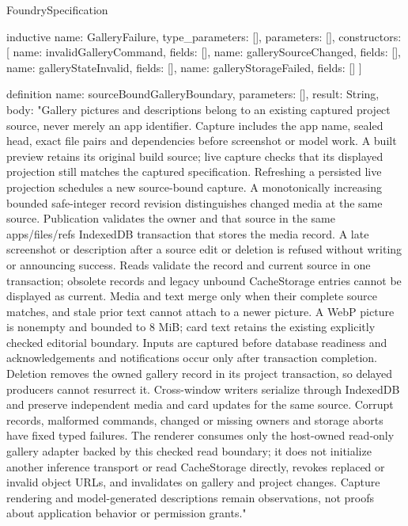 \begin{lexlean}{FoundrySpecification}
\begin{semanticmodule}
inductive{
  name: GalleryFailure,
  type_parameters: [],
  parameters: [],
  constructors: [
    {name: invalidGalleryCommand, fields: []},
    {name: gallerySourceChanged, fields: []},
    {name: galleryStateInvalid, fields: []},
    {name: galleryStorageFailed, fields: []}
  ]
}

definition{
  name: sourceBoundGalleryBoundary,
  parameters: [],
  result: String,
  body: "Gallery pictures and descriptions belong to an existing captured project source, never merely an app identifier. Capture includes the app name, sealed head, exact file pairs and dependencies before screenshot or model work. A built preview retains its original build source; live capture checks that its displayed projection still matches the captured specification. Refreshing a persisted live projection schedules a new source-bound capture. A monotonically increasing bounded safe-integer record revision distinguishes changed media at the same source. Publication validates the owner and that source in the same apps/files/refs IndexedDB transaction that stores the media record. A late screenshot or description after a source edit or deletion is refused without writing or announcing success. Reads validate the record and current source in one transaction; obsolete records and legacy unbound CacheStorage entries cannot be displayed as current. Media and text merge only when their complete source matches, and stale prior text cannot attach to a newer picture. A WebP picture is nonempty and bounded to 8 MiB; card text retains the existing explicitly checked editorial boundary. Inputs are captured before database readiness and acknowledgements and notifications occur only after transaction completion. Deletion removes the owned gallery record in its project transaction, so delayed producers cannot resurrect it. Cross-window writers serialize through IndexedDB and preserve independent media and card updates for the same source. Corrupt records, malformed commands, changed or missing owners and storage aborts have fixed typed failures. The renderer consumes only the host-owned read-only gallery adapter backed by this checked read boundary; it does not initialize another inference transport or read CacheStorage directly, revokes replaced or invalid object URLs, and invalidates on gallery and project changes. Capture rendering and model-generated descriptions remain observations, not proofs about application behavior or permission grants."
}


\end{semanticmodule}
\end{lexlean}
